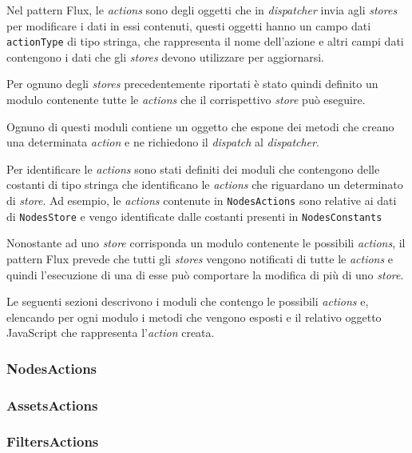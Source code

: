 Nel pattern Flux, le \textit{actions} sono degli oggetti che in \textit{dispatcher} invia agli \textit{stores} per modificare i dati in essi contenuti, questi oggetti hanno un campo dati \texttt{actionType} di tipo stringa, che rappresenta il nome dell'azione e altri campi dati contengono i dati che gli \textit{stores} devono utilizzare per aggiornarsi.

Per ognuno degli \textit{stores} precedentemente riportati è stato quindi definito un modulo contenente tutte le \textit{actions} che il corrispettivo \textit{store} può eseguire.

Ognuno di questi moduli contiene un oggetto che espone dei metodi che creano una determinata \textit{action} e ne richiedono il \textit{dispatch} al \textit{dispatcher}.

Per identificare le \textit{actions} sono stati definiti dei moduli che contengono delle costanti di tipo stringa che identificano le \textit{actions} che riguardano un determinato di \textit{store}. Ad esempio, le \textit{actions} contenute in \texttt{NodesActions} sono relative ai dati di \texttt{NodesStore} e vengo identificate dalle costanti presenti in \texttt{NodesConstants}

Nonostante ad uno \textit{store} corrisponda un modulo contenente le possibili \textit{actions}, il pattern Flux prevede che tutti gli \textit{stores} vengono notificati di tutte le \textit{actions} e quindi l'esecuzione di una di esse può comportare la modifica di più di uno \textit{store}.

Le seguenti sezioni descrivono i moduli che contengo le possibili \textit{actions} e, elencando per ogni modulo i metodi che vengono esposti e il relativo oggetto JavaScript che rappresenta l'\textit{action} creata.


\subsubsection{NodesActions}


\subsubsection{AssetsActions}


\subsubsection{FiltersActions}


